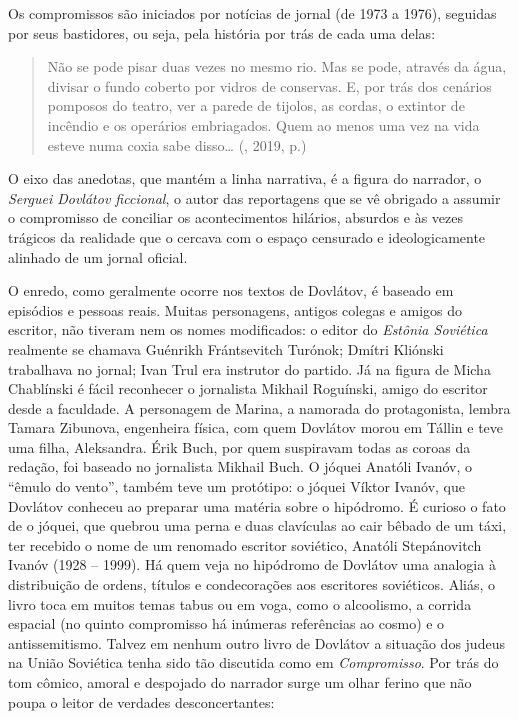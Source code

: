 Os compromissos são iniciados por notícias de jornal (de 1973 a 1976),
seguidas por seus bastidores, ou seja, pela história por trás de cada
uma delas:

\begin{quote}
Não se pode pisar duas vezes no mesmo rio. Mas se pode, através da água,
divisar o fundo coberto por vidros de conservas. E, por trás dos
cenários pomposos do teatro, ver a parede de tijolos, as cordas, o
extintor de incêndio e os operários embriagados. Quem ao menos uma vez
na vida esteve numa coxia sabe disso\ldots{} (, 2019, p.)
\end{quote}

O eixo das anedotas, que mantém a linha narrativa, é a figura do
narrador, o \emph{Serguei Dovlátov ficcional}, o autor das reportagens
que se vê obrigado a assumir o compromisso de conciliar os
acontecimentos hilários, absurdos e às vezes trágicos da realidade que o
cercava com o espaço censurado e ideologicamente alinhado de um jornal
oficial.

O enredo, como geralmente ocorre nos textos de Dovlátov, é baseado em
episódios e pessoas reais. Muitas personagens, antigos colegas e amigos
do escritor, não tiveram nem os nomes modificados: o editor do
\emph{Estônia Soviética} realmente se chamava Guénrikh Frántsevitch
Turónok; Dmítri Kliónski trabalhava no jornal; Ivan Trul era instrutor
do partido. Já na figura de Micha Chablínski é fácil reconhecer o
jornalista Mikhail Roguínski, amigo do escritor desde a faculdade. A
personagem de Marina, a namorada do protagonista, lembra Tamara
Zibunova, engenheira física, com quem Dovlátov morou em Tállin e teve
uma filha, Aleksandra. Érik Buch, por quem suspiravam todas as coroas da
redação, foi baseado no jornalista Mikhail Buch. O jóquei Anatóli
Ivanóv, o ``êmulo do vento'', também teve um protótipo: o jóquei Víktor
Ivanóv, que Dovlátov conheceu ao preparar uma matéria sobre o hipódromo.
É curioso o fato de o jóquei, que quebrou uma perna e duas clavículas ao
cair bêbado de um táxi, ter recebido o nome de um renomado escritor
soviético, Anatóli Stepánovitch Ivanóv (1928 -- 1999). Há quem veja no
hipódromo de Dovlátov uma analogia à distribuição de ordens, títulos e
condecorações aos escritores soviéticos. Aliás, o livro toca em muitos
temas tabus ou em voga, como o alcoolismo, a corrida espacial (no quinto
compromisso há inúmeras referências ao cosmo) e o antissemitismo. Talvez
em nenhum outro livro de Dovlátov a situação dos judeus na União
Soviética tenha sido tão discutida como em \emph{Compromisso}. Por trás
do tom cômico, amoral e despojado do narrador surge um olhar ferino que
não poupa o leitor de verdades desconcertantes:

